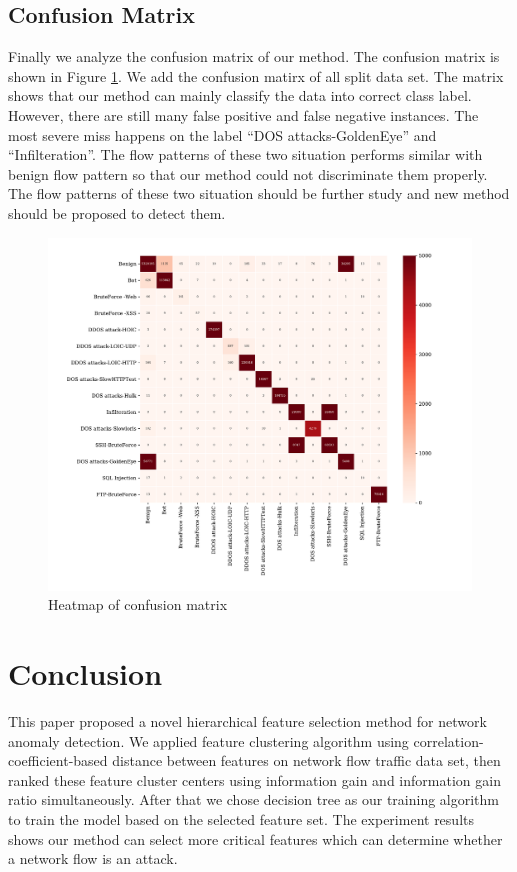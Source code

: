 \documentclass{ieeeaccess}
\theoremstyle{definition}
\begin{document}
\subsection{Confusion Matrix}

Finally we analyze the confusion matrix of our method. The confusion matrix is shown in Figure \ref{fig:confusion-matrix}. We add the confusion matirx of all split data set. The matrix shows that our method can mainly classify the data into correct class label. However, there are still many false positive and false negative instances. The most severe miss happens on the label ``DOS attacks-GoldenEye'' and ``Infilteration''. The flow patterns of these two situation performs similar with benign flow pattern so that our method could not discriminate them properly. The flow patterns of these two situation should be further study and new method should be proposed to detect them.  

\begin{figure}
    \centering
    \includegraphics[scale=0.5]{fig/confusion-matrix.pdf}
    \caption{Heatmap of confusion matrix}
    \label{fig:confusion-matrix}
\end{figure}

\section{Conclusion}
\label{sec:conclusion}

This paper proposed a novel hierarchical feature selection method for network anomaly detection. We applied feature clustering algorithm using correlation-coefficient-based distance between features on network flow traffic data set, then ranked these feature cluster centers using information gain and information gain ratio simultaneously. After that we chose decision tree as our training algorithm to train the model based on the selected feature set. The experiment results shows our method can select more critical features which can determine whether a network flow is an attack. 
\end{document}
